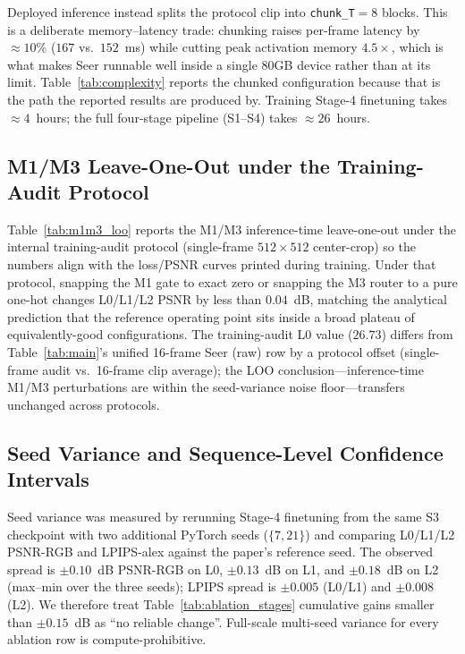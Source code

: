 Deployed inference instead splits the protocol clip into \texttt{chunk\_T}${=}8$ blocks. This is a deliberate memory--latency trade: chunking raises per-frame latency by ${\approx}10\%$ ($167$ vs.\ $152$~ms) while cutting peak activation memory $4.5\times$, which is what makes Seer runnable well inside a single 80GB device rather than at its limit. Table~\ref{tab:complexity} reports the chunked configuration because that is the path the reported results are produced by. Training Stage-4 finetuning takes $\approx4$~hours; the full four-stage pipeline (S1--S4) takes $\approx26$~hours.


\subsection{M1/M3 Leave-One-Out under the Training-Audit Protocol}\label{app:m1m3_unified}

Table~\ref{tab:m1m3_loo} reports the M1/M3 inference-time leave-one-out under the internal training-audit protocol (single-frame $512{\times}512$ center-crop) so the numbers align with the loss/PSNR curves printed during training. Under that protocol, snapping the M1 gate to exact zero or snapping the M3 router to a pure one-hot changes L0/L1/L2 PSNR by less than $0.04$~dB, matching the analytical prediction that the reference operating point sits inside a broad plateau of equivalently-good configurations. The training-audit L0 value ($26.73$) differs from Table~\ref{tab:main}'s unified 16-frame Seer (raw) row by a protocol offset (single-frame audit vs.\ 16-frame clip average); the LOO conclusion---inference-time M1/M3 perturbations are within the seed-variance noise floor---transfers unchanged across protocols.


\subsection{Seed Variance and Sequence-Level Confidence Intervals}\label{app:seed_variance}

Seed variance was measured by rerunning Stage-4 finetuning from the same S3 checkpoint with two additional PyTorch seeds ($\{7, 21\}$) and comparing L0/L1/L2 PSNR-RGB and LPIPS-alex against the paper's reference seed. The observed spread is $\pm 0.10$~dB PSNR-RGB on L0, $\pm 0.13$~dB on L1, and $\pm 0.18$~dB on L2 (max--min over the three seeds); LPIPS spread is $\pm 0.005$ (L0/L1) and $\pm 0.008$ (L2). We therefore treat Table~\ref{tab:ablation_stages} cumulative gains smaller than $\pm 0.15$~dB as ``no reliable change''. Full-scale multi-seed variance for every ablation row is compute-prohibitive.

